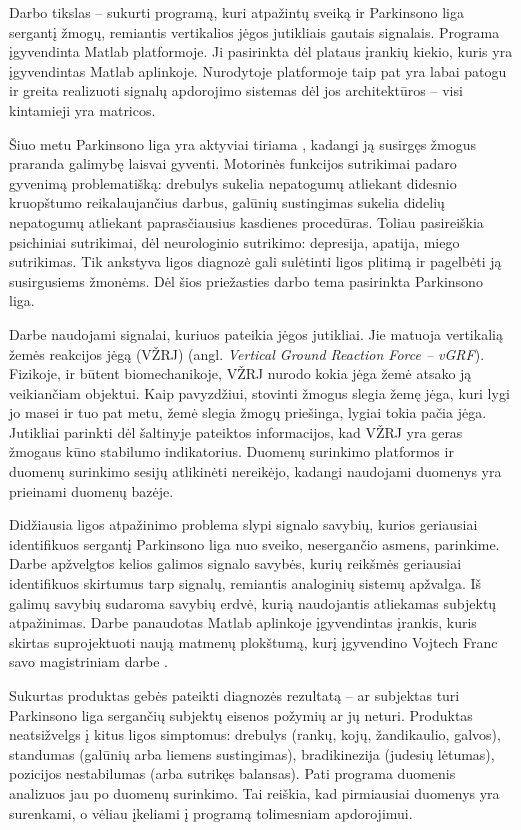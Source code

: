 \documentclass[]{vgtuef}
\begin{document}
Darbo tikslas -- sukurti programą, kuri atpažintų sveiką ir Parkinsono liga sergantį žmogų, remiantis vertikalios jėgos jutikliais gautais signalais. Programa įgyvendinta Matlab platformoje. Ji pasirinkta dėl plataus įrankių kiekio, kuris yra įgyvendintas Matlab aplinkoje. Nurodytoje platformoje taip pat yra labai patogu ir greita realizuoti signalų apdorojimo sistemas dėl jos architektūros -- visi kintamieji yra matricos. 

Šiuo metu Parkinsono liga yra aktyviai tiriama \cite{vgtu}, kadangi ją susirgęs žmogus praranda galimybę laisvai gyventi. Motorinės funkcijos sutrikimai padaro gyvenimą problematišką: drebulys sukelia nepatogumų atliekant didesnio kruopštumo reikalaujančius darbus, galūnių sustingimas sukelia didelių nepatogumų atliekant paprasčiausius kasdienes procedūras. Toliau pasireiškia psichiniai sutrikimai, dėl neurologinio sutrikimo: depresija, apatija, miego sutrikimas. Tik ankstyva ligos diagnozė gali sulėtinti ligos plitimą ir pagelbėti ją susirgusiems žmonėms. Dėl šios priežasties darbo tema pasirinkta Parkinsono liga.

Darbe naudojami signalai, kuriuos pateikia jėgos jutikliai. Jie matuoja vertikalią žemės reakcijos jėgą (VŽRJ) (angl. \textit{Vertical Ground Reaction Force -- vGRF}). Fizikoje, ir būtent biomechanikoje, VŽRJ nurodo kokia jėga žemė atsako ją veikiančiam objektui. Kaip pavyzdžiui, stovinti žmogus slegia žemę jėga, kuri lygi jo masei ir tuo pat metu, žemė slegia žmogų priešinga, lygiai tokia pačia jėga. Jutikliai parinkti dėl šaltinyje \cite{S0966-6362(05)00058-5} pateiktos informacijos, kad VŽRJ yra geras žmogaus kūno stabilumo indikatorius. Duomenų surinkimo platformos ir duomenų surinkimo sesijų atlikinėti nereikėjo, kadangi naudojami duomenys yra prieinami duomenų bazėje.

Didžiausia ligos atpažinimo problema slypi signalo savybių, kurios geriausiai identifikuos sergantį Parkinsono liga nuo sveiko, nesergančio asmens, parinkime. Darbe apžvelgtos kelios galimos signalo savybės, kurių reikšmės geriausiai identifikuos skirtumus tarp signalų, remiantis analoginių sistemų apžvalga. Iš galimų savybių sudaroma savybių erdvė, kurią naudojantis atliekamas subjektų atpažinimas. Darbe panaudotas Matlab aplinkoje įgyvendintas įrankis, kuris skirtas suprojektuoti naują matmenų plokštumą, kurį įgyvendino Vojtech Franc savo magistriniam darbe \cite{stprtool}. 

Sukurtas produktas gebės pateikti diagnozės rezultatą -- ar subjektas turi Parkinsono liga sergančių subjektų eisenos požymių ar jų neturi. Produktas neatsižvelgs į kitus ligos simptomus: drebulys (rankų, kojų, žandikaulio, galvos), standumas (galūnių arba liemens sustingimas), bradikinezija (judesių lėtumas), pozicijos nestabilumas (arba sutrikęs balansas). Pati programa duomenis analizuos jau po duomenų surinkimo. Tai reiškia, kad pirmiausiai duomenys yra surenkami, o vėliau įkeliami į programą tolimesniam apdorojimui.
\end{document}
